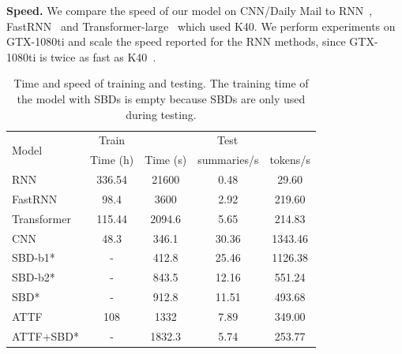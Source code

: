 \textbf{Speed.} 
We compare the speed of our model on CNN/Daily Mail to RNN~\citep{SeeLM17}, FastRNN~\citep{P18-1063} and Transformer-large~\citep{Attn17}
which used K40. 
We perform experiments on GTX-1080ti and scale the speed 
reported for the RNN methods,
since GTX-1080ti is twice as fast as K40~\citep{gehring2017convs2s}. 
\begin{table}[th!]
	\centering
	\caption{Time and speed of training and testing. The training time of the model with SBDs
		is empty because SBDs are only used during testing.}
	\begin{tabular}{lcccc}
		\toprule[1pt]
		\multirow{2}{*}{Model} & Train & \multicolumn{3}{c}{Test} \\
		\cmidrule[1pt](lr){2-2}\cmidrule[1pt]{3-5}
		& Time (h) & Time (s) & summaries/s & tokens/s \\
		\cmidrule[1pt]{1-5}
		RNN  & 336.54 &21600 & 0.48 & 29.60 \\
		FastRNN & 98.4  & 3600 & 2.92 & 219.60 \\
		Transformer & 115.44 & 2094.6 & 5.65 & 214.83 \\
		\hline
		CNN & 48.3 &346.1 & 30.36 & 1343.46 \\
		SBD-b1* & - & 412.8 & 25.46 & 1126.38 \\
		SBD-b2* & -  &843.5 &12.16 & 551.24 \\
		SBD* & - &912.8 & 11.51 & 493.68 \\
		ATTF & 108 &1332 & 7.89 &  349.00 \\
		ATTF+SBD* & - &1832.3 & 5.74 &  253.77 \\
		\bottomrule[1pt]
	\end{tabular}
	\label{tab:eval_speed}
\end{table}

